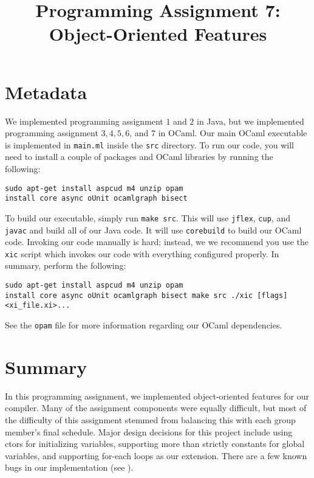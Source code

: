 \documentclass{hw} \title{Programming Assignment 7:\\ Object-Oriented Features}
\begin{document}
 \maketitle

\section{Metadata}\label{sec:metadata}
We implemented programming assignment $1$ and $2$ in Java, but we implemented
programming assignment $3,4,5,6$, and $7$ in OCaml. Our main OCaml executable is
implemented in \texttt{main.ml} inside the \texttt{src} directory. To run our
code, you will need to install a couple of packages and OCaml libraries by
running the following:

\begin{center} \begin{BVerbatim}
sudo apt-get install aspcud m4 unzip opam
install core async oUnit ocamlgraph bisect
\end{BVerbatim}
\end{center}

To build our executable, simply run \texttt{make src}. This will use
\texttt{jflex}, \texttt{cup}, and \texttt{javac} and build all of our Java
code. It will use \texttt{corebuild} to build our OCaml code. Invoking our code
manually is hard; instead, we we recommend you use the \texttt{xic} script
which invokes our code with everything configured properly.  In summary,
perform the following:

\begin{center}
\begin{BVerbatim}
sudo apt-get install aspcud m4 unzip opam
install core async oUnit ocamlgraph bisect make src ./xic [flags]
<xi_file.xi>...  \end{BVerbatim}
\end{center}

See the \texttt{opam} file for more information regarding our OCaml
dependencies.


\section{Summary}\label{sec:summary} In this programming assignment, we
implemented object-oriented features for our compiler.  Many of the assignment components were equally difficult, but most of the difficulty of this assignment stemmed from balancing this with each group member's final schedule. Major design decisions
for this project include using ctors for initializing variables, supporting more than strictly constants for global variables, and supporting for-each loops as our extension.  There are a few known bugs in our implementation (see ).
\end{document}
